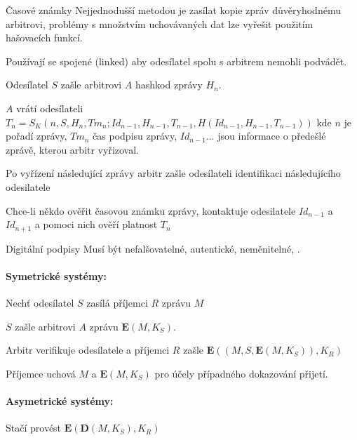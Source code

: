 \begin{obecne}{Časové známky}
  Nejjednodušší metodou je zasílat kopie zpráv důvěryhodnému arbitrovi, problémy s
  množstvím uchovávaných dat lze vyřešit použitím hašovacích funkcí.

  Používají se spojené (linked) aby odesílatel spolu s arbitrem nemohli podvádět.
  \begin{penumerate}
    \item Odesílatel $S$ zašle arbitrovi $A$ hashkod zprávy $H_n$.
    \item $A$ vrátí odesílateli 
    $T_n=S_K(n,S,H_n,Tm_n;Id_{n-1},H_{n-1},T_{n-1},H(Id_{n-1},H_{n-1},T_{n-1}))$
    kde $n$ je pořadí zprávy, $Tm_n$ čas podpisu zprávy, $Id_{n-1}\ldots$ jsou informace
    o předešlé zprávě, kterou arbitr vyřizoval.
    \item Po vyřízení následující zprávy arbitr zašle odesílateli identifikaci
    následujícího odesilatele
  \end{penumerate}
  Chce-li někdo ověřit časovou známku zprávy, kontaktuje odesilatele $Id_{n-1}$ a
  $Id_{n+1}$ a pomoci nich ověří platnost $T_n$
\end{obecne}

\begin{obecne}{Digitální podpisy}
  Musí být nefalšovatelné, autentické, neměnitelné, .
  \paragraph{Symetrické systémy:}
   Nechť odesílatel $S$ zasílá příjemci $R$ zprávu $M$
   \begin{penumerate}
      \item $S$ zašle arbitrovi $A$ zprávu $\mathbf{E}(M,K_S)$.
      \item Arbitr verifikuje odesílatele a příjemci $R$ zašle 
      $\mathbf{E}((M,S, \mathbf{E}(M,K_S)),K_R)$
      \item Příjemce uchová $M$ a $\mathbf{E}(M,K_S)$ pro účely případného dokazování přijetí.
   \end{penumerate}

   \paragraph{Asymetrické systémy:}
   Stačí provést $\mathbf{E}(\mathbf{D}(M,K_S),K_R)$

\end{obecne}

